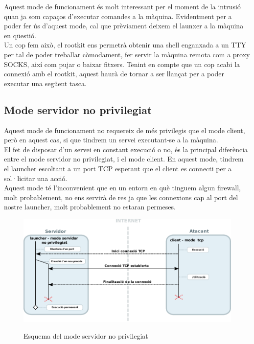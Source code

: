 Aquest mode de funcionament és molt interessant per el moment de la intrusió quan ja som capaços d'executar
comandes a la màquina. Evidentment per a poder fer ús d'aquest mode, cal que prèviament deixem el launxer 
a la màquina en qüestió. \\

Un cop fem això, el rootkit ens permetrà obtenir una shell enganxada a un TTY per tal de poder treballar 
còmodament, fer servir la màquina remota com a proxy SOCKS, així com pujar o baixar fitxers. Tenint en compte
que un cop acabi la connexió amb el rootkit, aquest haurà de tornar a ser llançat per a poder executar una següent
tasca. \\

\subsection{Mode servidor no privilegiat}

Aquest mode de funcionament no requereix de més privilegis que el mode client, però en aquest cas, si que
tindrem un servei executant-se a la màquina. \\

El fet de disposar d'un servei en constant execució o no, és la principal diferència entre el mode servidor
no privilegiat, i el mode client. En aquest mode, tindrem el launcher escoltant a un port TCP esperant que
el client es connecti per a sol·licitar una acció. \\

Aquest mode té l'inconvenient que en un entorn en què tinguem algun firewall, molt probablement, no ens 
servirà de res ja que les connexions cap al port del nostre launcher, molt probablement no estaran permeses. \\

\begin{figure}[htp]
    \centering
    \includegraphics[scale=1,keepaspectratio]{diagrames/solutionDesignUnprivilegedServerMode.pdf} \\
    \caption{Esquema del mode servidor no privilegiat}
    \label{fig:modeUnprivilegedServer}
\end{figure}


